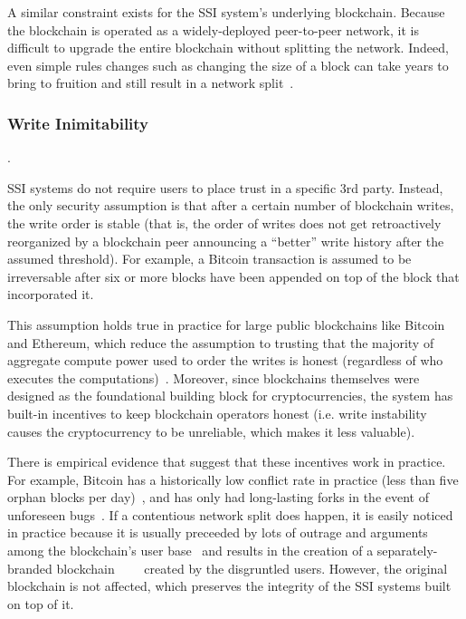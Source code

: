 A similar constraint exists for the SSI system's underlying blockchain.
Because the blockchain is operated as a widely-deployed peer-to-peer network,
it is difficult to upgrade the entire blockchain without splitting the network.
Indeed, even simple rules changes such as changing the size of a block can take 
years to bring to fruition and still result in a network
split~\cite{bitcoin-cash-split}.

\subsubsection{Write Inimitability}.

SSI systems do not require users to place trust in a specific 3rd
party.  Instead, the only security assumption is that after a certain number
of blockchain writes, the write order is stable (that is, the order of writes does not get
retroactively reorganized by a blockchain peer announcing a ``better'' write
history after the assumed threshold).  For example, a Bitcoin transaction is
assumed to be irreversable after six or more blocks have been appended on top of
the block that incorporated it.

This assumption holds true in
practice for large public blockchains like Bitcoin and Ethereum, which reduce the assumption to trusting
that the majority of aggregate compute power used to order the writes is honest
(regardless of who executes the computations)~\cite{proof-of-work}.  Moreover,
since blockchains themselves were designed as the foundational building block for
cryptocurrencies, the system has built-in incentives to keep blockchain
operators honest (i.e. write instability causes the cryptocurrency to be
unreliable, which makes it less valuable).

There is empirical evidence that suggest that these incentives work in practice.  For
example, Bitcoin has a historically low conflict rate in practice
(less than five orphan blocks per
day)~\cite{blockchain-info-orphan-rate}, and has only had long-lasting forks in
the event of unforeseen bugs~\cite{bitcoin-deep-fork}.  If a contentious network
split does happen, it is easily noticed in practice because it is usually
preceeded by lots of outrage and arguments among the blockchain's user
base~\cite{bitcoin-controversies} and results in the creation of a
separately-branded
blockchain~\cite{bitcoin-cash}~\cite{ethereum-classic}~\cite{zcash-classic}~\cite{expanse}
created by the disgruntled users.  However, the original blockchain is not
affected, which preserves the integrity of the SSI systems built on top of it.

